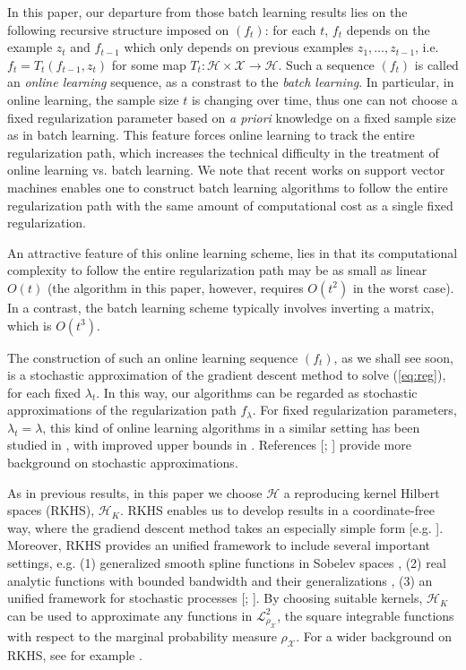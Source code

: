 \documentclass[twoside,11pt]{amsart}
\theoremstyle{theorem}
\theoremstyle{definition}
\theoremstyle{remark}
\def\L{{\mathscr L}}
\def\L2{{\mathscr L}^2_{\rho_\X}}
\def\H{{\mathscr H}}
\def\X{{\mathscr X}}
\def\la{\lambda}
\begin{document}
In this paper, our departure from those batch learning results lies on the following recursive structure imposed on $(f_t)$: for each $t$, 
$f_t$ depends on the example $z_t$ and $f_{t-1}$ which only depends on previous examples $z_1,\ldots, z_{t-1}$, i.e. $f_t=T_t(f_{t-1},z_t)$ 
for some map $T_t:\H\times \X \to \H$. Such a sequence $(f_t)$ is called an \emph{online learning} sequence, as a constrast to the \emph{batch learning}. 
In particular, in online learning, the sample size $t$ is changing over time, thus one can not choose a fixed regularization parameter based on 
\emph{a priori} knowledge on a fixed sample size as in batch learning. This feature forces online learning to track the entire regularization path, which increases the technical 
difficulty in the treatment of online learning vs. batch learning. We note that recent works on support vector machines \cite{HasRosTibZhu04} enables one to construct 
batch learning algorithms to follow the entire regularization path with the same amount of computational cost as a single fixed regularization.

An attractive feature of this online learning scheme, lies in that its computational complexity to follow the entire regularization path
may be as small as linear $O(t)$ (the algorithm in this paper, however, requires $O(t^2)$ in the worst case). 
In a contrast, the batch learning scheme typically involves inverting a matrix, which is $O(t^3)$. 

The construction of such an online learning sequence $(f_t)$, as we shall see soon, is a stochastic approximation of the gradient descent method to 
solve (\ref{eq:reg}), for each fixed $\la_t$. In this way, our algorithms can be regarded as stochastic approximations of the regularization path $f_\la$.
For fixed regularization parameters, $\la_t = \la$, this kind of online learning algorithms in a similar setting has been studied in 
\cite{SmaYao05}, with improved upper bounds in \cite{Yao05}. References [; ] provide more background on 
stochastic approximations.  

As in previous results, in this paper we choose $\H$ a reproducing kernel Hilbert spaces (RKHS), $\H_K$. RKHS enables us to develop results in a 
coordinate-free way, where the gradiend descent method takes an especially simple form [e.g. ]. 
Moreover, RKHS provides an unified framework to include several important settings, e.g. 
(1) generalized smooth spline functions in Sobelev spaces \cite{Wahba90}, (2) real analytic functions with bounded bandwidth \cite{Daubechies92} 
and their generalizations \cite{SmaZho-ShannonI}, (3) an unified framework for stochastic processes [; ]. 
By choosing suitable kernels, $\H_K$ can be used to approximate any functions in $\L2$, the square integrable functions with respect to 
the marginal probability measure $\rho_\X$. For a wider background on RKHS, see for example \cite{BerTho04}. 
\end{document}
